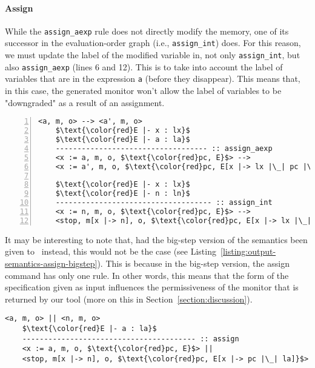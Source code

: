 \documentclass[conference]{IEEEtran}
\begin{document}
\paragraph{Assign}
While the \lstinline{assign_aexp} rule does not directly modify the memory, one of its successor in the evaluation-order graph (i.e., \lstinline{assign_int}) does. For this reason, we must update the label of the modified variable in, not only \lstinline{assign_int}, but also \lstinline{assign_aexp} (lines 6 and 12). This is to take into account the label of variables that are in the expression \lstinline{a} (before they disappear). This means that, in this case, the generated monitor won't allow the label of variables to be "downgraded" as a result of an assignment.
\begin{lstlisting}[label=listing:output-semantics-assign,numbers=left,captionpos=b,caption=Ott-IFC's output for the "assign" command]
	<a, m, o> --> <a', m, o>
	$\text{\color{red}E |- x : lx}$
	$\text{\color{red}E |- a : la}$
	----------------------------------- :: assign_aexp
	<x := a, m, o, $\text{\color{red}pc, E}$> --> 
	<x := a', m, o, $\text{\color{red}pc, E[x |-> lx |\_| pc |\_| la]}$>
	
	$\text{\color{red}E |- x : lx}$
	$\text{\color{red}E |- n : ln}$
	------------------------------------ :: assign_int
	<x := n, m, o, $\text{\color{red}pc, E}$> --> 
	<stop, m[x |-> n], o, $\text{\color{red}pc, E[x |-> lx |\_| pc |\_| ln]}$>
\end{lstlisting}

It may be interesting to note that, had the big-step version of the semantics been given to \ottifc\ instead, this would not be the case (see Listing~\ref{listing:output-semantics-assign-bigstep}). This is because in the big-step version, the assign command has only one rule. In other words, this means that the form of the specification given as input influences the permissiveness of the monitor that is returned by our tool (more on this in Section~\ref{section:discussion}).
\begin{lstlisting}[label=listing:output-semantics-assign-bigstep,captionpos=b,caption=Ott-IFC's output the big-step version of the "assign" command]
	<a, m, o> || <n, m, o>
	$\text{\color{red}E |- a : la}$
	---------------------------------------- :: assign
	<x := a, m, o, $\text{\color{red}pc, E}$> || 
	<stop, m[x |-> n], o, $\text{\color{red}pc, E[x |-> pc |\_| la]}$>
\end{lstlisting}
\end{document}
